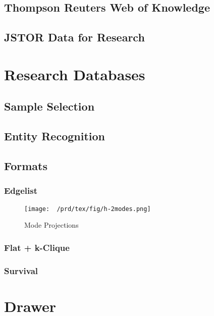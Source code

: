 \subsection{Thompson Reuters Web of
Knowledge}\label{thompson-reuters-web-of-knowledge}

\subsection{JSTOR Data for Research}\label{jstor-data-for-research}

\section{Research Databases}\label{research-databases}

\subsection{Sample Selection}\label{sample-selection}

\subsection{Entity Recognition}\label{entity-recognition}

\subsection{Formats}\label{formats}

\subsubsection{Edgelist}\label{edgelist}

\begin{figure}[htbp]
\centering
\texttt{[image: ~/prd/tex/fig/h-2modes.png]}
\caption{Mode Projections}
\end{figure}

\subsubsection{Flat + k-Clique}\label{flat-k-clique}

\subsubsection{Survival}\label{survival}

\section{Drawer}\label{drawer}
